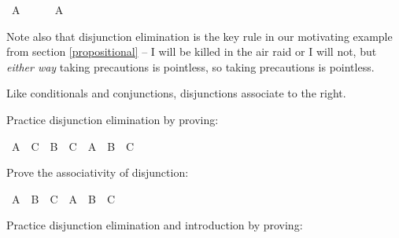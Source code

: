 \begin{isabellebody}
\ {\isachardoublequoteopen}A{\isachardoublequoteclose}\isanewline
\ \ \ \ \isamarkupfalse%
\ {\isachardoublequoteopen}A{\isachardoublequoteclose}\isacommand{{\isachardot}}\isamarkupfalse%
\isanewline
\ \ \isamarkupfalse%
\isanewline
{}\isamarkupfalse%
%
\endisatagproof
{\isafoldproof}%
%
\isadelimproof
%
\endisadelimproof
%
\begin{isamarkuptext}%
Note also that disjunction elimination is the key rule in our motivating example from
section \ref{propositional} -- I will be killed in the air raid or I will not, but \emph{either way}
taking precautions is pointless, so taking precautions is pointless.%
\end{isamarkuptext}\isamarkuptrue%
%
\begin{isamarkuptext}%
Like conditionals and conjunctions, disjunctions associate to the right.%
\end{isamarkuptext}\isamarkuptrue%
%
\begin{isamarkuptext}%
\begin{Exercise} Practice disjunction elimination by proving: \end{Exercise}%
\end{isamarkuptext}\isamarkuptrue%
\isamarkupfalse%
\ {\isachardoublequoteopen}{\isacharparenleft}A\ {\isasymlongrightarrow}\ C{\isacharparenright}\ {\isasymand}\ {\isacharparenleft}B\ {\isasymlongrightarrow}\ C{\isacharparenright}\ {\isasymlongrightarrow}\ A\ {\isasymor}\ B\ {\isasymlongrightarrow}\ C{\isachardoublequoteclose}%
\isadelimproof
\ %
\endisadelimproof
%
\isatagproof
{}\isamarkupfalse%
%
\endisatagproof
{\isafoldproof}%
%
\isadelimproof
%
\endisadelimproof
%
\begin{isamarkuptext}%
\begin{Exercise}[title = The Associativity of Disjunction] 
Prove the associativity of disjunction: \end{Exercise}%
\end{isamarkuptext}\isamarkuptrue%
\isamarkupfalse%
\ {\isachardoublequoteopen}A\ {\isasymor}\ B\ {\isasymor}\ C\ {\isasymlongleftrightarrow}\ {\isacharparenleft}A\ {\isasymor}\ B{\isacharparenright}\ {\isasymor}\ C{\isachardoublequoteclose}%
\isadelimproof
\ %
\endisadelimproof
%
\isatagproof
{}\isamarkupfalse%
%
\endisatagproof
{\isafoldproof}%
%
\isadelimproof
%
\endisadelimproof
%
\begin{isamarkuptext}%
\begin{Exercise}\label{disjEexercises} Practice disjunction elimination and introduction by proving: \end{Exercise}%

\end{isamarkuptext}
\end{isabellebody}
